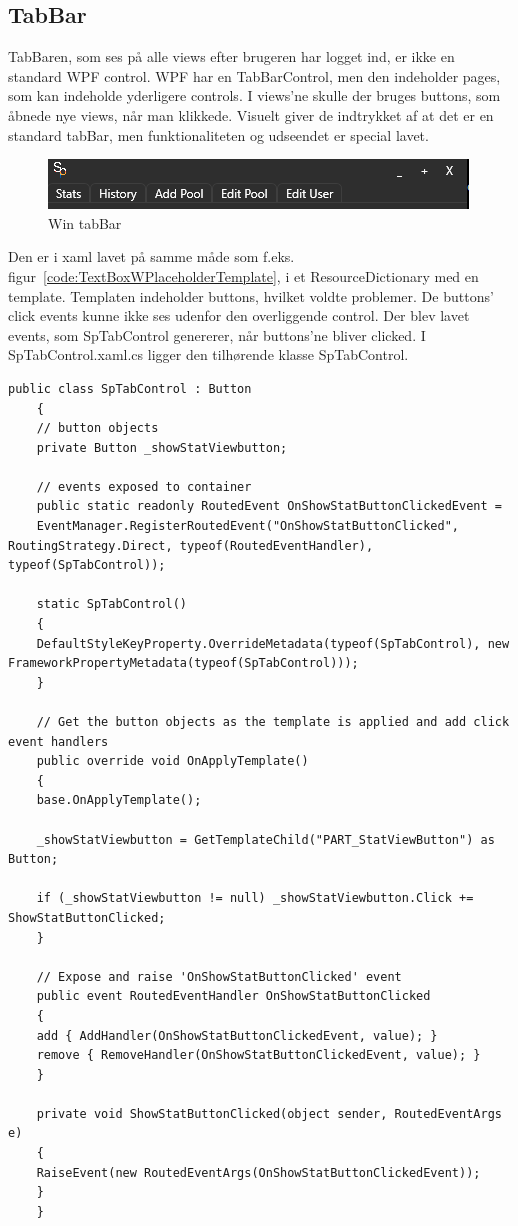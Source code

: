 \subsection{TabBar}
TabBaren, som ses på alle views efter brugeren har logget ind, er ikke en standard WPF control. WPF har en TabBarControl, men den indeholder pages, som kan indeholde yderligere controls. I views'ne skulle der bruges buttons, som åbnede nye views, når man klikkede. Visuelt giver de indtrykket af at det er en standard tabBar, men funktionaliteten og udseendet er special lavet.
\begin{figure}
\centering
\includegraphics[width=0.7\linewidth]{figs/implementering/tabbar}
\caption{Win tabBar}
\label{fig:tabbar}
\end{figure}
Den er i xaml lavet på samme måde som f.eks. figur~\ref{code:TextBoxWPlaceholderTemplate}, i et ResourceDictionary med en template. 
Templaten indeholder buttons, hvilket voldte problemer. De buttons' click events kunne ikke ses udenfor den overliggende control. Der blev lavet events, som SpTabControl genererer, når buttons'ne bliver clicked.
I SpTabControl.xaml.cs ligger den tilhørende klasse SpTabControl.
\begin{lstlisting}[caption=SpTabControl, label=SpTabControl]
	public class SpTabControl : Button
	{
	// button objects
	private Button _showStatViewbutton;
	
	// events exposed to container
	public static readonly RoutedEvent OnShowStatButtonClickedEvent =
	EventManager.RegisterRoutedEvent("OnShowStatButtonClicked", RoutingStrategy.Direct, typeof(RoutedEventHandler), typeof(SpTabControl));
		
	static SpTabControl()
	{
	DefaultStyleKeyProperty.OverrideMetadata(typeof(SpTabControl), new FrameworkPropertyMetadata(typeof(SpTabControl)));
	}
	
	// Get the button objects as the template is applied and add click event handlers
	public override void OnApplyTemplate()
	{
	base.OnApplyTemplate();
	
	_showStatViewbutton = GetTemplateChild("PART_StatViewButton") as Button;
		
	if (_showStatViewbutton != null) _showStatViewbutton.Click += ShowStatButtonClicked;
	}
	
	// Expose and raise 'OnShowStatButtonClicked' event
	public event RoutedEventHandler OnShowStatButtonClicked
	{
	add { AddHandler(OnShowStatButtonClickedEvent, value); }
	remove { RemoveHandler(OnShowStatButtonClickedEvent, value); }
	}
	
	private void ShowStatButtonClicked(object sender, RoutedEventArgs e)
	{
	RaiseEvent(new RoutedEventArgs(OnShowStatButtonClickedEvent));
	}
	}
\end{lstlisting}


